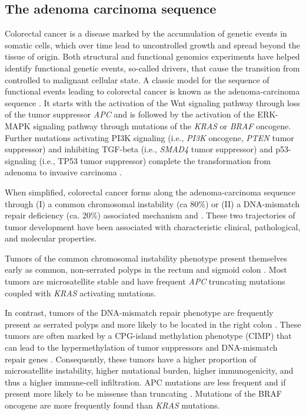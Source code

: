 \begin{flushleft}
\subsection{The adenoma carcinoma sequence}
Colorectal cancer is a disease marked by the accumulation of genetic events in somatic cells, which over time lead to uncontrolled growth and spread beyond the tissue of origin. Both structural and functional genomics experiments have helped identify functional genetic events, so-called drivers, that cause the transition from controlled to malignant cellular state. A classic model for the sequence of functional events leading to colorectal cancer is known as the adenoma-carcinoma sequence \parencite{vogelsteinGeneticAlterationsColorectaltumor1988}. It starts with the activation of the Wnt signaling pathway through loss of the tumor suppressor \textit{APC} and is followed by the activation of the ERK-MAPK signaling pathway through mutations of the \textit{KRAS} or \textit{BRAF} oncogene. Further mutations activating PI3K signaling (i.e., \textit{PI3K} oncogene, \textit{PTEN} tumor suppressor) and inhibiting TGF-beta (i.e., \textit{SMAD4} tumor suppressor) and p53-signaling (i.e., TP53 tumor suppressor) complete the transformation from adenoma to invasive carcinoma \parencite{fearonMolecularGeneticsColorectal2011}. \par

When simplified, colorectal cancer forms along the adenoma-carcinoma sequence through (I) a common chromosomal instability (ca 80\%) or (II) a DNA-mismatch repair deficiency (ca. 20\%) associated mechanism \parencite{markowitzMolecularOriginsCancer2009} and \parencite{pancioneGeneticEpigeneticEvents2012}. These two trajectories of tumor development have been associated with characteristic clinical, pathological, and molecular properties. 
\par

Tumors of the common chromosomal instability phenotype present themselves early as common, non-serrated polyps in the rectum and sigmoid colon \parencite{markowitzMolecularOriginsCancer2009}. Most tumors are microsatellite stable and have frequent \textit{APC} truncating mutations coupled with \textit{KRAS} activating mutations. 
\par 

In contrast, tumors of the DNA-mismatch repair phenotype are frequently present as serrated polyps and more likely to be located in the right colon \parencite{markowitzMolecularOriginsCancer2009}. These tumors are often marked by a CPG-island methylation phenotype (CIMP) that can lead to the hypermethylation of tumor suppressors and DNA-mismatch repair genes \parencite{oginoCpGIslandMethylator2009}. Consequently, these tumors have a higher proportion of microsatellite instability, higher mutational burden, higher immunogenicity, and thus a higher immune-cell infiltration. APC mutations are less frequent and if present more likely to be missense than truncating \parencite{borowskyRoleAPCWNT2018}. Mutations of the BRAF oncogene are more frequently found than \textit{KRAS} mutations. 
\par


\end{flushleft}

